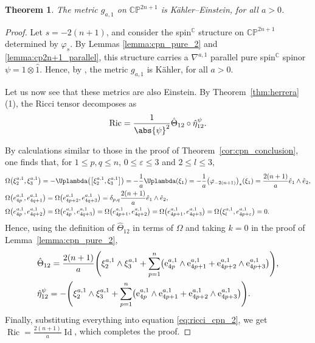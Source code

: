 \documentclass[pdftex]{sigma}
\numberwithin{equation}{section}
\newtheorem{Theorem}{Theorem}[section]
\newcommand{\C}{\mathbb{C}} %
\DeclareMathOperator{\Id}{Id}
\DeclareMathOperator{\Ric}{Ric}
\begin{document}
		\begin{Theorem}
			The metric $g_{a,1}$ on $\mathbb{CP}^{2n+1}$ is K\"{a}hler--Einstein, for all $a > 0$.
		\end{Theorem}
		\begin{proof}
			Let $s = -2(n+1)$, and consider the spin$^{\C}$ structure on $\mathbb{CP}^{2n+1}$ determined by $\varphi_s$. By Lemmas \ref{lemma:cpn_pure_2} and \ref{lemma:cp2n+1_parallel}, this structure carries a $\nabla^{a,1}$ parallel pure spin$^{\mathbb{C}}$ spinor $\psi=1 \otimes \hat{1}$. Hence, by \cite[Corollary~4.10]{ES19}, the metric $g_{a,1}$ is K\"{a}hler, for all $a > 0$.
			
			Let us now see that these metrics are also Einstein. By Theorem~\ref{thm:herrera}\,(1), the Ricci tensor decomposes as
			\begin{equation}\label{eq:ricci_cpn_2}
				\Ric = \frac{1}{\abs{\psi}^2} \hat{\Theta}_{1 2} \circ \hat{\eta}_{1 2}^{\psi} .
			\end{equation}
			
			By calculations similar to those in the proof of Theorem~\ref{cor:cpn_conclusion}, one finds that, for $1 \leq p,q \leq n$, $0 \leq \varepsilon \leq 3$ and $2 \leq l \leq 3$,
			\begin{align*}
				&\Omega\bigl(\xi^{a,1}_2,\xi^{a,1}_3 \bigr) = - \Uplambda \bigl( \bigl[ \xi^{a,1}_2 , \xi^{a,1}_3 \bigr] \bigr) = -\frac{1}{a} \Uplambda ( \xi_1 ) = -\frac{1}{a} \bigl( \varphi_{-2(n+1)} \bigr)_* ( \xi_1 ) = \frac{2(n+1)}{a} \hat{e}_1 \wedge \hat{e}_2 , \\
				&\Omega\bigl(e^{a,1}_{4p},e^{a,1}_{4q+1} \bigr) = \Omega\bigl(e^{a,1}_{4p+2},e^{a,1}_{4q+3} \bigr) = \delta_{p,q} \frac{2(n+1)}{a} \hat{e}_1 \wedge \hat{e}_2 , \\
				&\Omega\bigl(e^{a,1}_{4p},e^{a,1}_{4q+2} \bigr) = \Omega\bigl(e^{a,1}_{4p},e^{a,1}_{4q+3} \bigr) = \Omega\bigl(e^{a,1}_{4p+1},e^{a,1}_{4q+2} \bigr) = \Omega\bigl(e^{a,1}_{4p+1},e^{a,1}_{4q+3} \bigr) = \Omega\bigl(\xi^{a,1}_l,e^{a,1}_{4p + \varepsilon} \bigr) = 0 .
			\end{align*}
			Hence, using the definition of $\hat{\Theta}_{12}$ in terms of $\Omega$ and taking $k=0$ in the proof of Lemma~\ref{lemma:cpn_pure_2},
			\begin{align*}
				&\hat{\Theta}_{1 2} = \frac{2(n+1)}{a} \Bigg( \xi^{a,1}_{2} \wedge \xi^{a,1}_{3} + \sum_{p=1}^n \bigl( {\rm e}^{a,1}_{4p} \wedge {\rm e}^{a,1}_{4p+1} + {\rm e}^{a,1}_{4p+2} \wedge {\rm e}^{a,1}_{4p+3} \bigr) \Bigg) , \\
				&\hat{\eta}_{1 2}^{\psi} = - \Bigg( \xi^{a,1}_{2} \wedge \xi^{a,1}_{3} + \sum_{p=1}^n \bigl( {\rm e}^{a,1}_{4p} \wedge {\rm e}^{a,1}_{4p+1} + {\rm e}^{a,1}_{4p+2} \wedge {\rm e}^{a,1}_{4p+3} \bigr) \Bigg) .
			\end{align*}
			Finally, substituting everything into equation \eqref{eq:ricci_cpn_2}, we get
			$
			\Ric = \frac{2(n+1)}{a} \Id$,
			which completes the proof.
		\end{proof}
		
\end{document}
